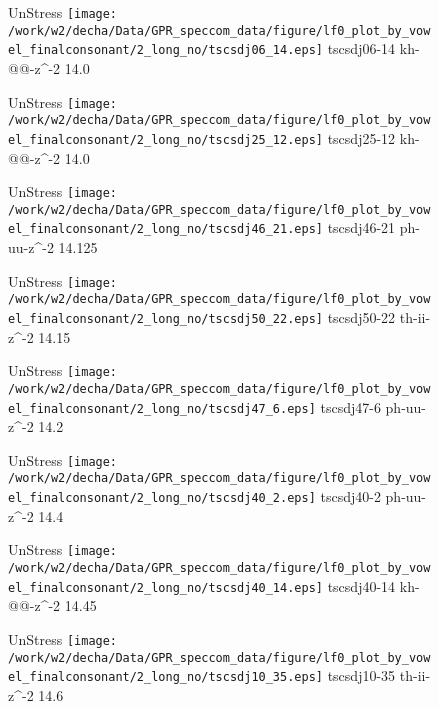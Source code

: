 \documentclass{article}
\begin{document}
\begin{figure}[t]
\begin{minipage}[b]{.24\textwidth}
UnStress
\centering
\texttt{[image: /work/w2/decha/Data/GPR\_speccom\_data/figure/lf0\_plot\_by\_vowel\_finalconsonant/2\_long\_no/tscsdj06\_14.eps]}
tscsdj06-14 kh-@@-z\textasciicircum-2 14.0
\end{minipage}
\begin{minipage}[b]{.24\textwidth}
UnStress
\centering
\texttt{[image: /work/w2/decha/Data/GPR\_speccom\_data/figure/lf0\_plot\_by\_vowel\_finalconsonant/2\_long\_no/tscsdj25\_12.eps]}
tscsdj25-12 kh-@@-z\textasciicircum-2 14.0
\end{minipage}
\begin{minipage}[b]{.24\textwidth}
UnStress
\centering
\texttt{[image: /work/w2/decha/Data/GPR\_speccom\_data/figure/lf0\_plot\_by\_vowel\_finalconsonant/2\_long\_no/tscsdj46\_21.eps]}
tscsdj46-21 ph-uu-z\textasciicircum-2 14.125
\end{minipage}
\begin{minipage}[b]{.24\textwidth}
UnStress
\centering
\texttt{[image: /work/w2/decha/Data/GPR\_speccom\_data/figure/lf0\_plot\_by\_vowel\_finalconsonant/2\_long\_no/tscsdj50\_22.eps]}
tscsdj50-22 th-ii-z\textasciicircum-2 14.15
\end{minipage}
\end{figure}
\clearpage
\begin{figure}[t]
\begin{minipage}[b]{.24\textwidth}
UnStress
\centering
\texttt{[image: /work/w2/decha/Data/GPR\_speccom\_data/figure/lf0\_plot\_by\_vowel\_finalconsonant/2\_long\_no/tscsdj47\_6.eps]}
tscsdj47-6 ph-uu-z\textasciicircum-2 14.2
\end{minipage}
\begin{minipage}[b]{.24\textwidth}
UnStress
\centering
\texttt{[image: /work/w2/decha/Data/GPR\_speccom\_data/figure/lf0\_plot\_by\_vowel\_finalconsonant/2\_long\_no/tscsdj40\_2.eps]}
tscsdj40-2 ph-uu-z\textasciicircum-2 14.4
\end{minipage}
\begin{minipage}[b]{.24\textwidth}
UnStress
\centering
\texttt{[image: /work/w2/decha/Data/GPR\_speccom\_data/figure/lf0\_plot\_by\_vowel\_finalconsonant/2\_long\_no/tscsdj40\_14.eps]}
tscsdj40-14 kh-@@-z\textasciicircum-2 14.45
\end{minipage}
\begin{minipage}[b]{.24\textwidth}
UnStress
\centering
\texttt{[image: /work/w2/decha/Data/GPR\_speccom\_data/figure/lf0\_plot\_by\_vowel\_finalconsonant/2\_long\_no/tscsdj10\_35.eps]}
tscsdj10-35 th-ii-z\textasciicircum-2 14.6
\end{minipage}
\end{figure}
\end{document}
